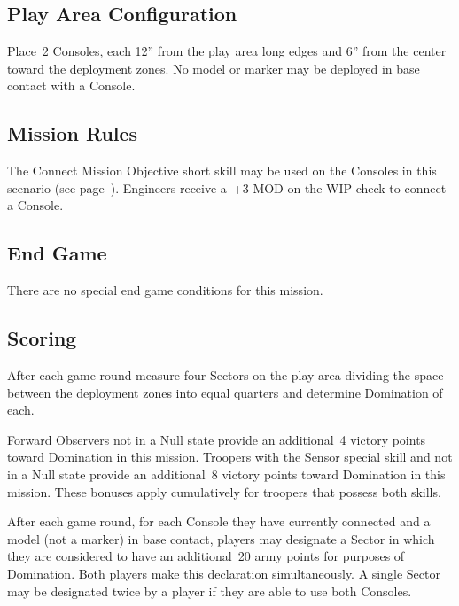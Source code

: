 \label{mission:sweepandclear}

\subsection{Play Area Configuration}

Place~2 Consoles, each 12'' from the play area long edges and 6'' from
the center toward the deployment zones.  No model or marker may be
deployed in base contact with a Console.

\subsection{Mission Rules}

The Connect Mission Objective short skill may be used on the Consoles
in this scenario (see page~\pageref{sec:hack-objective}).  Engineers
receive a~+3 MOD on the WIP check to connect a Console.

\subsection{End Game}

There are no special end game conditions for this mission.

\subsection{Scoring}


  After each game round measure four
Sectors on the play area dividing the space between the deployment
zones into equal quarters and determine Domination of each.

 Forward Observers not in a Null state
provide an additional~4 victory points toward Domination in this
mission.  Troopers with the Sensor special skill and not in a Null
state provide an additional~8 victory points toward Domination in this
mission. These bonuses apply cumulatively for troopers that possess
both skills.

  After each game round, for each
Console they have currently connected and a model (not a marker) in
base contact, players may designate a Sector in which they are
considered to have an additional~20 army points for purposes of
Domination.  Both players make this declaration simultaneously.  A
single Sector may be designated twice by a player if they are able to
use both Consoles.

